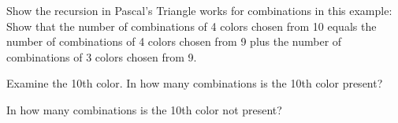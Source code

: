 \documentclass[number]{ximera}
\begin{document}
\begin{problem}
Show the recursion in Pascal's Triangle works for combinations in this example: Show that the number of combinations of 4 colors chosen from 10 equals the number of combinations of 4 colors chosen from 9 plus the number of combinations of 3 colors chosen from 9. 
\begin{hint}Examine the 10th color. In how many combinations is the 10th color present?
\end{hint}
\begin{hint}
In how many combinations is the 10th color not present?
\end{hint}
\begin{freeResponse}
\end{freeResponse}
\end{problem}
\end{document}
